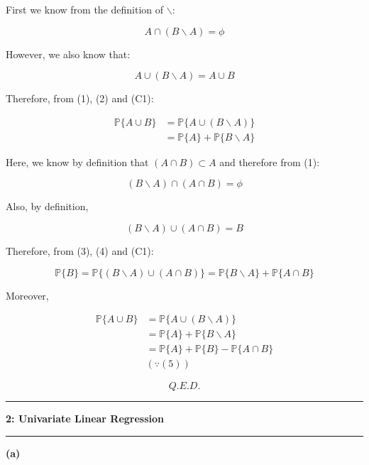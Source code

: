 \documentclass[11pt]{article}
\newcommand\question[2]{\vspace{.25in}\hrule\textbf{#1: #2}\vspace{.5em}\hrule\vspace{.10in}}
\renewcommand\part[1]{\vspace{.10in}\textbf{(#1)}}
\renewcommand{\P}{\mathbb{P}}
\begin{document}
First we know from the definition of $\backslash$:

\begin{equation} \tag{1}
A \cap (B \backslash A) = \phi
\end{equation}

However, we also know that:

\begin{equation} \tag{2}
A \cup (B \backslash A) = A \cup B
\end{equation}

Therefore, from (1), (2) and (C1):

$$
\begin{aligned}
\P\{A \cup B\} &= \P\{A \cup (B \backslash A)\} \\
&= \P\{A\} + \P\{B \backslash A\}
\end{aligned}
$$

Here, we know by definition that $(A \cap B) \subset A$ and
therefore from (1):

\begin{equation} \tag{3}
(B \backslash A) \cap (A \cap B) = \phi 
\end{equation}

Also, by definition, 

\begin{equation} \tag{4}
(B \backslash A) \cup (A \cap B) = B
\end{equation}

Therefore, from (3), (4) and (C1):

\begin{equation} \tag{5}
\P\{B\} = \P\{(B \backslash A) \cup (A \cap B)\}
= \P\{B \backslash A\} + \P\{A \cap B\}
\end{equation}

Moreover,

$$
\begin{aligned}
\P\{A \cup B\} &= \P\{A \cup (B \backslash A)\} \\
&= \P\{A\} + \P\{B \backslash A\} \\
&= \P\{A\} + \P\{B\} - \P\{A \cap B\} \\
&(\because (5))
\end{aligned}
$$

$$
Q.E.D.
$$

\newpage

\question{2}{Univariate Linear Regression}

\part{a}
\end{document}
